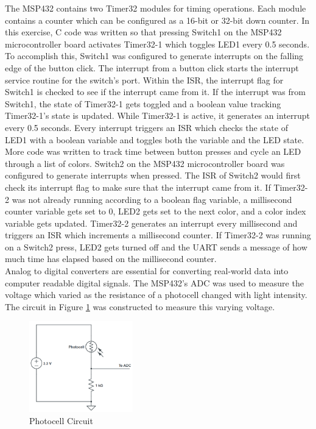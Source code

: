 \documentclass[CMPE]{KGCOEReport}
\begin{document}
The MSP432 contains two Timer32 modules for timing operations. Each module contains a counter which can be configured as a 16-bit or 32-bit down counter. In this exercise, C code was written so that pressing Switch1 on the MSP432 microcontroller board activates Timer32-1 which toggles LED1 every 0.5 seconds. To accomplish this, Switch1 was configured to generate interrupts on the falling edge of the button click. The interrupt from a button click starts the interrupt service routine for the switch's port. Within the ISR, the interrupt flag for Switch1 is checked to see if the interrupt came from it. If the interrupt was from Switch1, the state of Timer32-1 gets toggled and a boolean value tracking Timer32-1's state is updated. While Timer32-1 is active, it generates an interrupt every 0.5 seconds. Every interrupt triggers an ISR which checks the state of LED1 with a boolean variable and toggles both the variable and the LED state.\\

More code was written to track time between button presses and cycle an LED through a list of colors. Switch2 on the MSP432 microcontroller board was configured to generate interrupts when pressed. The ISR of Switch2 would first check its interrupt flag to make sure that the interrupt came from it. If Timer32-2 was not already running according to a boolean flag variable, a millisecond counter variable gets set to 0, LED2 gets set to the next color, and a color index variable gets updated. Timer32-2 generates an interrupt every millisecond and triggers an ISR which increments a millisecond counter. If Timer32-2 was running on a Switch2 press, LED2 gets turned off and the UART sends a message of how much time has elapsed based on the millisecond counter. \\

Analog to digital converters are essential for converting real-world data into computer readable digital signals. The MSP432's ADC was used to measure the voltage which varied as the resistance of a photocell changed with light intensity. The circuit in Figure \ref{fig:photocell} was constructed to measure this varying voltage.

\begin{figure}[H]
    \centering
    \includegraphics[width=0.4\textwidth]{photocellCircuit.png}
    \caption{Photocell Circuit}
    \label{fig:photocell}
\end{figure}
\end{document}
